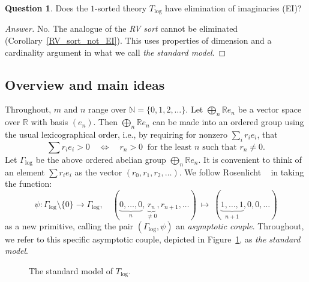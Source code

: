 \documentclass[11pt]{amsart}
\theoremstyle{plain}
\theoremstyle{definition}
\newtheorem*{question*}{Question}
\numberwithin{equation}{section}
\newcommand\N{\mathbb{N}}
\newcommand\R{\mathbb{R}}
\newcommand\0{\varnothing}
\begin{document}
\begin{question*}
Does the $1$-sorted theory $T_{\log}$ have elimination of imaginaries (EI)?
\end{question*}
\begin{proof}[Answer]\renewcommand{\qedsymbol}{}
No. The analogue of the \emph{RV sort} cannot be eliminated (Corollary~\ref{RV_sort_not_EI}). This uses properties of dimension and a cardinality argument in what we call \emph{the standard model}.
\end{proof}


\subsection*{Overview and main ideas}
Throughout, $m$ and $n$ range over $\N=\{0,1,2,\ldots\}$. Let $\bigoplus_n\R e_n$ be a vector space over $\R$ with basis $(e_n)$. Then $\bigoplus_n\R e_n$ can be made into an ordered group using the usual lexicographical order, i.e., by requiring for nonzero $\sum_ir_ie_i$, that
\[
\textstyle\sum r_ie_i > 0 \quad \iff \quad r_n > 0 \ \text{ for the least $n$ such that $r_n\neq 0$.}
\]
Let $\Gamma_{\log}$ be the above ordered abelian group $\bigoplus_n\R e_n$. It is convenient to think of an element $\sum r_ie_i$ as the vector $(r_0,r_1,r_2,\ldots)$. We follow Rosenlicht
~\cite{rosen-dvalgp2}
in taking the function:
\[
\psi \colon \Gamma_{\log}\setminus\{0\}\to\Gamma_{\log},\quad (\underbrace{0,\ldots,0}_{n},\underbrace{r_n}_{\neq 0},r_{n+1},\ldots)\ \mapsto \ (\underbrace{1,\ldots,1}_{n+1},0,0,\ldots)
\]
as a new primitive, calling the pair $(\Gamma_{\log},\psi)$ an \emph{asymptotic couple}. 
Throughout, we refer to this specific asymptotic couple, depicted in Figure~\ref{standardmodel}, as \emph{the standard model}. 

\begin{figure}[h!]
\caption{The standard model of $T_{\log}$. }
\label{standardmodel}
\begin{center}
\end{center}
\end{figure}
\end{document}
